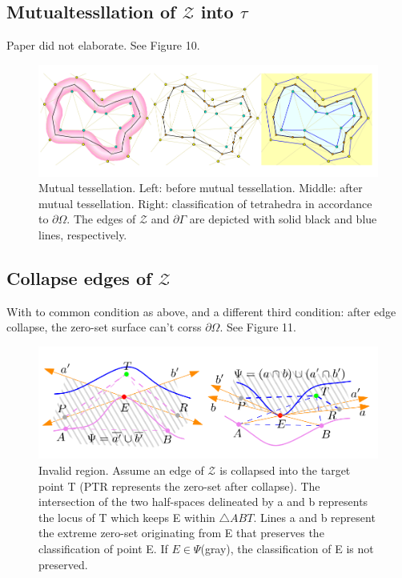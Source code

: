 \documentclass{article}
\theoremstyle{definition}
\theoremstyle{remark}
\begin{document}
\subsection{Mutualtessllation of $\mathcal{Z}$ into $\tau$}
Paper did not elaborate. See Figure 10.
\begin{figure}[H]
 	\includegraphics[width=\textwidth]{10}
	\caption[mt]
        {Mutual tessellation. Left: before mutual tessellation. Middle: after mutual tessellation. Right: classification of tetrahedra in accordance to $\partial \Omega$. The edges of $\mathcal{Z}$ and $\partial \Gamma$ are depicted with solid black and blue lines, respectively.}
 	\centering
\end{figure}
\subsection{Collapse edges of $\mathcal{Z}$}
With to common condition as above, and a different third condition: after edge collapse, the zero-set surface can't corss $\partial \Omega$. See Figure 11.
\begin{figure}[H]
 	\includegraphics[width=\textwidth]{11}
	\caption[Edge Collapse of Z]
        {Invalid region. Assume an edge of $\mathcal{Z}$ is collapsed into the target point T (PTR represents the zero-set after collapse). The intersection of the two half-spaces delineated by a and b represents the locus of T which keeps E within $\bigtriangleup ABT$. Lines a and b represent the extreme zero-set originating from E that preserves the classification of point E. If $E \in \Psi$(gray), the classification of E is not preserved.}
 	\centering
\end{figure}
\end{document}

